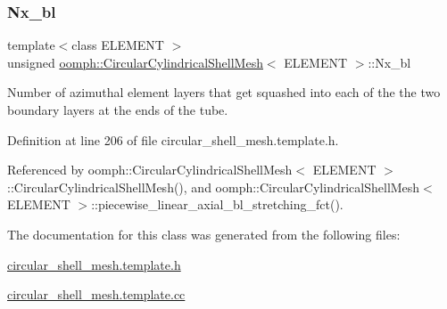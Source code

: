 \subsubsection{\texorpdfstring{Nx\+\_\+bl}{Nx\_bl}}
{\footnotesize\ttfamily template$<$class E\+L\+E\+M\+E\+NT $>$ \\
unsigned \hyperlink{classoomph_1_1CircularCylindricalShellMesh}{oomph\+::\+Circular\+Cylindrical\+Shell\+Mesh}$<$ E\+L\+E\+M\+E\+NT $>$\+::Nx\+\_\+bl\hspace{0.3cm}{\ttfamily [private]}}



Number of azimuthal element layers that get squashed into each of the the two boundary layers at the ends of the tube. 



Definition at line 206 of file circular\+\_\+shell\+\_\+mesh.\+template.\+h.



Referenced by oomph\+::\+Circular\+Cylindrical\+Shell\+Mesh$<$ E\+L\+E\+M\+E\+N\+T $>$\+::\+Circular\+Cylindrical\+Shell\+Mesh(), and oomph\+::\+Circular\+Cylindrical\+Shell\+Mesh$<$ E\+L\+E\+M\+E\+N\+T $>$\+::piecewise\+\_\+linear\+\_\+axial\+\_\+bl\+\_\+stretching\+\_\+fct().



The documentation for this class was generated from the following files\+:\begin{DoxyCompactItemize}
\item 
\hyperlink{circular__shell__mesh_8template_8h}{circular\+\_\+shell\+\_\+mesh.\+template.\+h}\item 
\hyperlink{circular__shell__mesh_8template_8cc}{circular\+\_\+shell\+\_\+mesh.\+template.\+cc}\end{DoxyCompactItemize}
